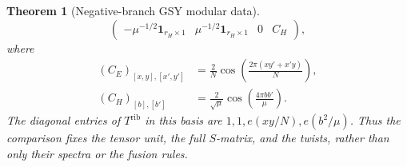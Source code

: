 \documentclass[11pt,a4paper]{article}
\numberwithin{equation}{section}
\newtheorem{theorem}{Theorem}[section]
\theoremstyle{definition}\newtheorem{definition}[theorem]{Definition}
\theoremstyle{remark}\newtheorem{remark}[theorem]{Remark}
\begin{document}
\begin{theorem}[Negative-branch GSY modular data]
\begin{equation}
\begin{pmatrix}
 -\mu^{-1/2}\mathbf1_{r_H\times1}&\mu^{-1/2}\mathbf1_{r_H\times1}&0&C_H
 \end{pmatrix},
\end{equation}
where
\begin{align}
 (C_E)_{[x,y],[x',y']}
   &=\frac2N\cos\left(\frac{2\pi(xy'+x'y)}N\right),
                                                    \label{eq:gsy-CE}\\
 (C_H)_{[b],[b']}
   &=\frac2{\sqrt\mu}\cos\left(\frac{4\pi bb'}\mu\right).
                                                    \label{eq:gsy-CH}
\end{align}
The diagonal entries of $T^{\mathrm{rib}}$ in this basis are
$1,1,e(xy/N),e(b^2/\mu)$. Thus the comparison fixes the tensor
unit, the full $S$-matrix, and the twists, rather than only their
spectra or the fusion rules.
\end{theorem}
\end{document}
